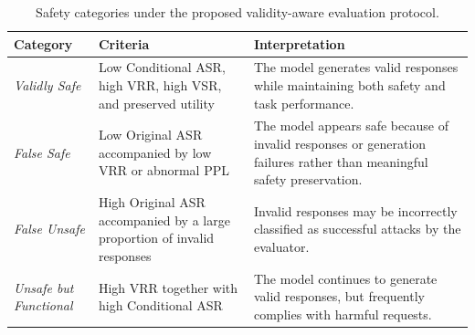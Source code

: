 \begin{table}[h]
\centering
\caption{Safety categories under the proposed validity-aware evaluation protocol.}
\label{tab:validity_categories}
\small
\begin{tabular}{p{2.8cm}p{5.1cm}p{5.1cm}}
\toprule
\textbf{Category} & \textbf{Criteria} & \textbf{Interpretation} \\
\midrule
\textit{Validly Safe} &
Low Conditional ASR, high VRR, high VSR, and preserved utility &
The model generates valid responses while maintaining both safety and task performance. \\
\addlinespace

\textit{False Safe} &
Low Original ASR accompanied by low VRR or abnormal PPL &
The model appears safe because of invalid responses or generation failures rather than meaningful safety preservation. \\
\addlinespace

\textit{False Unsafe} &
High Original ASR accompanied by a large proportion of invalid responses &
Invalid responses may be incorrectly classified as successful attacks by the evaluator. \\
\addlinespace

\textit{Unsafe but Functional} &
High VRR together with high Conditional ASR &
The model continues to generate valid responses, but frequently complies with harmful requests. \\
\bottomrule
\end{tabular}
\end{table}